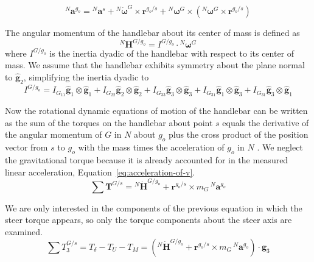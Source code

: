 \documentclass[10pt]{article}
\begin{document}
\begin{equation}
  ^N\mathbf{a}^{g_o} = {}^N\mathbf{a}^s +
    {}^N\dot{\boldsymbol{\omega}}^G\times\mathbf{r}^{g_o/s} +
    {}^N\boldsymbol{\omega}^G\times({}^N\boldsymbol{\omega}^G\times\mathbf{r}^{g_o/s})
\end{equation}

The angular momentum of the handlebar about its center of mass is defined as
%
\begin{equation}
  ^N\mathbf{H}^{G/g_o} = I^{G/g_o} \cdot {}^N\boldsymbol{\omega}^G
\end{equation}
%
where $I^{G/g_o}$ is the inertia dyadic of the handlebar with respect to its
center of mass. We assume that the handlebar exhibits symmetry about the plane
normal to $\hat{\mathbf{g}}_2$, simplifying the inertia dyadic to
%
\begin{equation}
  I^{G/g_o} =
    I_{G_{11}} \hat{\mathbf{g}}_1 \otimes \hat{\mathbf{g}}_1 +
    I_{G_{22}} \hat{\mathbf{g}}_2 \otimes \hat{\mathbf{g}}_2 +
    I_{G_{33}} \hat{\mathbf{g}}_3 \otimes \hat{\mathbf{g}}_3 +
    I_{G_{31}} \hat{\mathbf{g}}_1 \otimes \hat{\mathbf{g}}_3 +
    I_{G_{31}} \hat{\mathbf{g}}_3 \otimes \hat{\mathbf{g}}_1
\end{equation}

Now the rotational dynamic equations of motion of the handlebar can be written as the sum
of the torques on the handlebar about point $s$ equals the derivative of
the angular momentum of $G$ in $N$ about $g_o$ plus the cross product of the
position vector from $s$ to $g_o$ with the mass times the acceleration of $g_o$ in $N$
\cite{Meriam1975}. We neglect the gravitational torque because it is already
accounted for in the measured linear acceleration,
Equation~\ref{eq:acceleration-of-v}.
%
\begin{equation}
  \sum \mathbf{T}^{G/s} = {}^N\dot{\mathbf{H}}^{G/g_o} +
    \mathbf{r}^{g_o/s} \times m_G\,{}^N\mathbf{a}^{g_o}
\end{equation}

We are only interested in the components of the previous equation in which the
steer torque appears, so only the torque components about the steer axis are examined.
%
\begin{equation}
  \sum T^{G/s}_3 = T_\delta - T_U - T_M = \left({}^N\dot{\mathbf{H}}^{G/g_o} +
  \mathbf{r}^{g_o/s} \times m_G\,{}^N\mathbf{a}^{g_o}\right) \cdot \hat{\mathbf{g}}_3
\end{equation}
\end{document}
